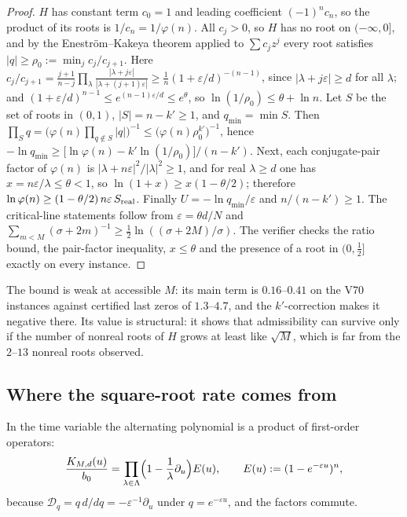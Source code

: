 \documentclass[11pt]{article}
\theoremstyle{definition}
\theoremstyle{remark}
\begin{document}
\begin{proof}
\(H\) has constant term \(c_0=1\) and leading coefficient \((-1)^nc_n\),
so the product of its roots is \(1/c_n=1/\varphi(n)\).  All \(c_j>0\), so
\(H\) has no root on \((-\infty,0]\), and by the Enestr\"om--Kakeya theorem
applied to \(\sum c_jz^j\) every root satisfies
\(|q|\ge\rho_0:=\min_jc_j/c_{j+1}\).  Here
\(c_j/c_{j+1}=\frac{j+1}{n-j}\prod_{\lambda}\frac{|\lambda+j\varepsilon|}{|\lambda+(j+1)\varepsilon|}
\ge\frac1n(1+\varepsilon/d)^{-(n-1)}\), since \(|\lambda+j\varepsilon|\ge d\)
for all \(\lambda\); and \((1+\varepsilon/d)^{n-1}\le e^{(n-1)\varepsilon/d}\le e^\theta\),
so \(\ln(1/\rho_0)\le\theta+\ln n\).  Let \(S\) be the set of roots in
\((0,1)\), \(|S|=n-k'\ge1\), and \(q_{\min}=\min S\).  Then
\(\prod_{S}q=\bigl(\varphi(n)\prod_{q\notin S}|q|\bigr)^{-1}
\le\bigl(\varphi(n)\rho_0^{k'}\bigr)^{-1}\), hence
\(-\ln q_{\min}\ge\bigl[\ln\varphi(n)-k'\ln(1/\rho_0)\bigr]/(n-k')\).
Next, each conjugate-pair factor of \(\varphi(n)\) is
\(|\lambda+n\varepsilon|^2/|\lambda|^2\ge1\), and for real
\(\lambda\ge d\) one has \(x=n\varepsilon/\lambda\le\theta<1\), so
\(\ln(1+x)\ge x(1-\theta/2)\); therefore
\(\ln\varphi(n)\ge(1-\theta/2)\,n\varepsilon\,S_{\rm real}\).  Finally
\(U=-\ln q_{\min}/\varepsilon\) and \(n/(n-k')\ge1\).  The critical-line
statements follow from \(\varepsilon=\theta d/N\) and
\(\sum_{m<M}(\sigma+2m)^{-1}\ge\tfrac12\ln((\sigma+2M)/\sigma)\).  The
verifier checks the ratio bound, the pair-factor inequality, \(x\le\theta\)
and the presence of a root in \((0,\tfrac12]\) exactly on every instance.
\end{proof}

The bound is weak at accessible \(M\): its main term is \(0.16\)--\(0.41\)
on the V70 instances against certified last zeros of \(1.3\)--\(4.7\), and
the \(k'\)-correction makes it negative there.  Its value is structural:
it shows that admissibility can survive only if the number of nonreal
roots of \(H\) grows at least like \(\sqrt M\), which is far from the
\(2\)--\(13\) nonreal roots observed.

\subsection{Where the square-root rate comes from}

In the time variable the alternating polynomial is a product of
first-order operators:
\begin{equation}
 \frac{K_{M,d}(u)}{b_0}=\prod_{\lambda\in\Lambda}\Bigl(1-\frac1\lambda\partial_u\Bigr)E(u),
 \qquad E(u):=(1-e^{-\varepsilon u})^n,
 \label{eq:f2v71-operators}
\end{equation}
because \(\mathcal D_q=q\,d/dq=-\varepsilon^{-1}\partial_u\) under
\(q=e^{-\varepsilon u}\), and the factors commute.
\end{document}
